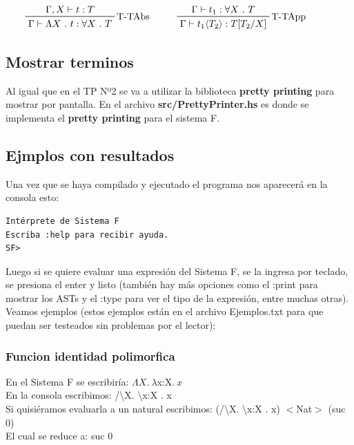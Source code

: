 \documentclass[12pt, titlepage, a4paper]{article}
\begin{document}
\begin{displaymath}
    \prftree[r]{T-TAbs}{\Gamma, X \vdash t : T}{\Gamma \vdash \Lambda X \ . \ t : \forall X \ . \ T} \hspace{1cm}
    \prftree[r]{T-TApp}{\Gamma \vdash t_1 : \forall X \ . \ T}{\Gamma \vdash t_1 \langle T_2 \rangle : T[T_2/X]} \hspace{1cm}
\end{displaymath}

\subsection{Mostrar terminos}
Al igual que en el TP Nº2 \cite{tp2:lambdaCalculoSimpleTipado} se va a utilizar la biblioteca \textbf{pretty printing} para mostrar por 
pantalla. En el archivo
\textbf{src/PrettyPrinter.hs} es donde se implementa el \textbf{pretty printing} para el sistema F.

\subsection{Ejmplos con resultados}
Una vez que se haya compilado y ejecutado el programa nos aparecerá en la consola esto:

\begin{verbatim}
Intérprete de Sistema F
Escriba :help para recibir ayuda.
SF>
\end{verbatim}


Luego si se quiere evaluar una expresión del Sistema F, se la ingresa por teclado, se presiona el enter y listo 
(también hay más opciones como el :print para mostrar los ASTs y el :type para ver el tipo de la expresión, entre muchas otras). \\

Veamos ejemplos (estos ejemplos están en el archivo Ejemplos.txt para que puedan ser testeados sin problemas por el lector):

\subsubsection{Funcion identidad polimorfica}
\noindent En el Sistema F se escribiría: $\Lambda X.\ \lambda $x:X$. \ x$ \\
En la consola escribimos: /\textbackslash X. \textbackslash x:X . x \\
Si quisiéramos evaluarla a un natural escribimos: (/\textbackslash X. \textbackslash x:X . x)  $<$Nat$>$ (suc 0) \\
El cual se reduce a: suc 0
\end{document}
